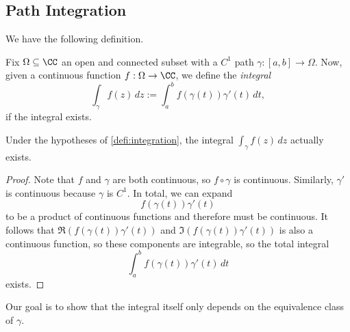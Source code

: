 \subsection{Path Integration}
We have the following definition.
\begin{definition}[Integration] \label{defi:integration}
	Fix $\Omega\subseteq\CC$ an open and connected subset with a $C^1$ path $\gamma:[a,b]\to\Omega$. Now, given a continuous function $f:\Omega\to\CC$, we define the \textit{integral}
	\[\int_\gamma f(z)\,dz:=\int_a^bf(\gamma(t))\gamma'(t)\,dt,\]
	if the integral exists.
\end{definition}
\begin{lemma}
	Under the hypotheses of \autoref{defi:integration}, the integral $\int_\gamma f(z)\,dz$ actually exists.
\end{lemma}
\begin{proof}
	Note that $f$ and $\gamma$ are both continuous, so $f\circ\gamma$ is continuous. Similarly, $\gamma'$ is continuous because $\gamma$ is $C^1$. In total, we can expand
	\[f(\gamma(t))\gamma'(t)\]
	to be a product of continuous functions and therefore must be continuous. It follows that $\Re(f(\gamma(t))\gamma'(t))$ and $\Im(f(\gamma(t))\gamma'(t))$ is also a continuous function, so these components are integrable, so the total integral
	\[\int_a^bf(\gamma(t))\gamma'(t)\,dt\]
	exists.
\end{proof}
Our goal is to show that the integral itself only depends on the equivalence class of $\gamma$.


